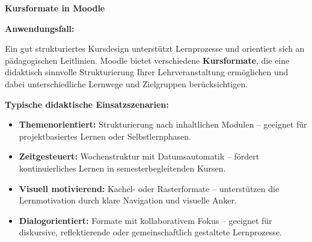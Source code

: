 \documentclass{article}
\newlength{\commonwidth}
\begin{document}
\begin{center}
\textbf{\textcolor{customred}{\LARGE Kursformate in Moodle \faSitemap}}
\end{center}

\vspace{0.5cm}

\begin{center}
\begin{minipage}{\commonwidth}
\begin{mdframed}[backgroundcolor=lightgray, linewidth=0pt, roundcorner=5pt]
\textbf{Anwendungsfall:}

Ein gut strukturiertes Kursdesign unterstützt Lernprozesse und orientiert sich an pädagogischen Leitlinien. Moodle bietet verschiedene \textbf{Kursformate}, die eine didaktisch sinnvolle Strukturierung Ihrer Lehrveranstaltung ermöglichen und dabei unterschiedliche Lernwege und Zielgruppen berücksichtigen.

\vspace{0.3cm}

\textbf{Typische didaktische Einsatzszenarien:}
\begin{itemize}
  \item \textbf{Themenorientiert:} Strukturierung nach inhaltlichen Modulen – geeignet für projektbasiertes Lernen oder Selbstlernphasen.
  \item \textbf{Zeitgesteuert:} Wochenstruktur mit Datumsautomatik – fördert kontinuierliches Lernen in semesterbegleitenden Kursen.
  \item \textbf{Visuell motivierend:} Kachel- oder Rasterformate – unterstützen die Lernmotivation durch klare Navigation und visuelle Anker.
  \item \textbf{Dialogorientiert:} Formate mit kollaborativem Fokus – geeignet für diskursive, reflektierende oder gemeinschaftlich gestaltete Lernprozesse.
\end{itemize}
\end{mdframed}
\end{minipage}
\end{center}

\vspace{0.8cm}

\renewcommand{\arraystretch}{1.4}
\setlength{\tabcolsep}{8pt}
\end{document}
